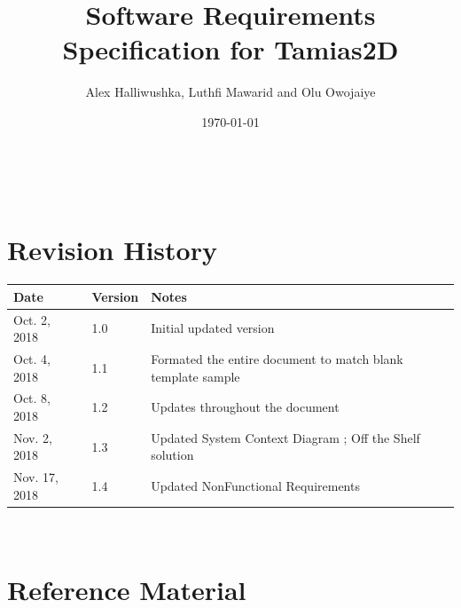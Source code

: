 \documentclass[12pt]{article}
\begin{document}
\title{Software Requirements Specification for Tamias2D} 	    
\author{Alex Halliwushka, Luthfi Mawarid and Olu Owojaiye}  
\date{\today}
	
\maketitle

~\newpage  


\section{Revision History} 

\begin{tabularx}{\textwidth}{p{3cm}p{2cm}X}
\toprule {\bf Date} & {\bf Version} & {\bf Notes}\\
\midrule
Oct. 2, 2018  & 1.0 & Initial updated version\\
Oct. 4, 2018 & 1.1 & Formated the entire document to match blank template sample\\
Oct. 8, 2018 & 1.2 & Updates throughout the document\\
Nov. 2, 2018 & 1.3 & Updated System Context Diagram ; Off the Shelf solution\\
Nov. 17, 2018 & 1.4 & Updated NonFunctional Requirements\\

\bottomrule
\end{tabularx}


~\newpage



%
%

\section{Reference Material} 
\end{document}

